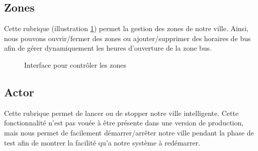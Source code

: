 \subsection{Zones}
Cette rubrique (illustration \ref{senseurs}) permet la gestion des zones de notre ville. Ainsi, nous pouvons ouvrir/fermer des zones ou ajouter/supprimer des horaires de bus afin de gérer dynamiquement les heures d’ouverture de la zone bus.
\begin{figure}[H]
    \begin{center}
        \caption{Interface pour contrôler les zones}\label{senseurs}
    \end{center}
\end{figure}

\subsection{Actor}
Cette rubrique permet de lancer ou de stopper notre ville intelligente. Cette fonctionnalité n’est pas vouée à être présente dans une version de production, mais nous permet de facilement démarrer/arrêter notre ville pendant la phase de test afin de montrer la facilité qu’a notre système à redémarrer.

